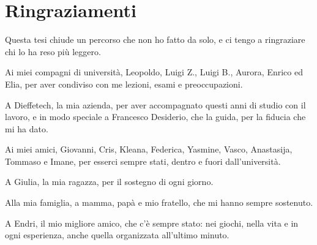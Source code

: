 \chapter*{Ringraziamenti}\label{chapter:ringraziamenti}

Questa tesi chiude un percorso che non ho fatto da solo, e ci tengo a ringraziare
chi lo ha reso più leggero.

Ai miei compagni di università, Leopoldo, Luigi Z., Luigi B., Aurora, Enrico
ed Elia, per aver condiviso con me lezioni, esami e preoccupazioni.

A Dieffetech, la mia azienda, per aver accompagnato questi anni di studio con il
lavoro, e in modo speciale a Francesco Desiderio, che la guida, per la fiducia
che mi ha dato.

Ai miei amici, Giovanni, Cris, Kleana, Federica, Yasmine, Vasco, Anastasija,
Tommaso e Imane, per esserci sempre stati, dentro e fuori dall'università.

A Giulia, la mia ragazza, per il sostegno di ogni giorno.

Alla mia famiglia, a mamma, papà e mio fratello, che mi hanno sempre sostenuto.

A Endri, il mio migliore amico, che c'è sempre stato: nei giochi, nella vita e in
ogni esperienza, anche quella organizzata all'ultimo minuto.
